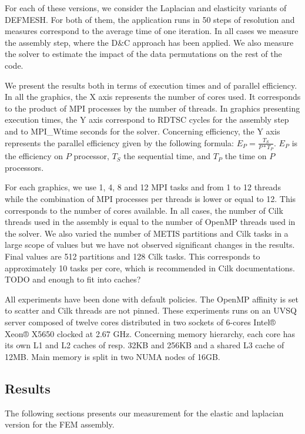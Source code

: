 \documentclass{IOS-Book-Article}
\begin{document}
For each of these versions, we consider the Laplacian and elasticity variants of DEFMESH.
For both of them, the application runs in 50 steps of resolution and measures correspond to the average time of one iteration.
In all cases we measure the assembly step, where the D\&C approach has been applied.
We also measure the solver to estimate the impact of the data permutations on the rest of the code.

We present the results both in terms of execution times and of parallel efficiency.
In all the graphics, the X axis represents the number of cores used. It corresponds to the product of MPI processes by the number of threads.
In graphics presenting execution times, the Y axis correspond to RDTSC cycles for the assembly step and to MPI\_Wtime seconds for the solver.
Concerning efficiency, the Y axis represents the parallel efficiency given by the following formula:
$E_{P} = \frac{T_{S}}{P*T_{P}}$. $E_{P}$ is the efficiency on $P$ processor, $T_{S}$ the sequential time, and $T_{P}$ the time on $P$ processors.

For each graphics, we use 1, 4, 8 and 12 MPI tasks and from 1 to 12 threads while the combination of MPI processes per threads is lower or equal to 12.
This corresponds to the number of cores available. In all cases, the number of Cilk threads used in the assembly is equal to the number of OpenMP threads used in the solver.
We also varied the number of METIS partitions and Cilk tasks in a large scope of values but we have not observed significant changes in the results.
Final values are 512 partitions and 128 Cilk tasks. This corresponds to approximately 10 tasks per core, which is recommended in Cilk documentations. TODO and enough to fit into caches?

All experiments have been done with default policies. The OpenMP affinity is set to scatter and Cilk threads are not pinned.
These experiments runs on an UVSQ server composed of twelve cores distributed in two sockets of 6-cores Intel® Xeon® X5650 clocked at 2.67 GHz.
Concerning memory hierarchy, each core has its own L1 and L2 caches of resp. 32KB and 256KB and a shared L3 cache of 12MB. Main memory is split in two NUMA nodes of 16GB.

\subsection{Results}

The following sections presents our measurement for the elastic and laplacian version for the FEM assembly. 
\end{document}
